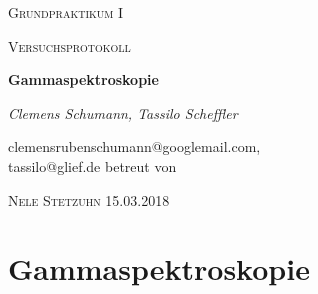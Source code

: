 \documentclass[11pt,a4paper]{article}
\begin{document}
 
 \begin{center}
  {\scshape\LARGE Grundpraktikum I \par}
  \vspace{1cm}
  {\scshape\Large Versuchsprotokoll\par}
  \vspace{1.5cm}
  {\huge\bfseries Gammaspektroskopie\par}
  \vspace{2cm}
     {\large \itshape{Clemens Schumann, Tassilo Scheffler}\/ \par}
  \vspace{0.5cm}
  {clemensrubenschumann@googlemail.com, \\ tassilo@glief.de}
  \vfill
  betreut von\par
  \textsc{Nele Stetzuhn }
  \vfill
  {\Large 15.03.2018}
 
 \end{center}
 
 \thispagestyle{empty}
 
 \newpage
 \setcounter{page}{1}
 \tableofcontents
 \newpage
 \section*{Gammaspektroskopie}
\end{document}
